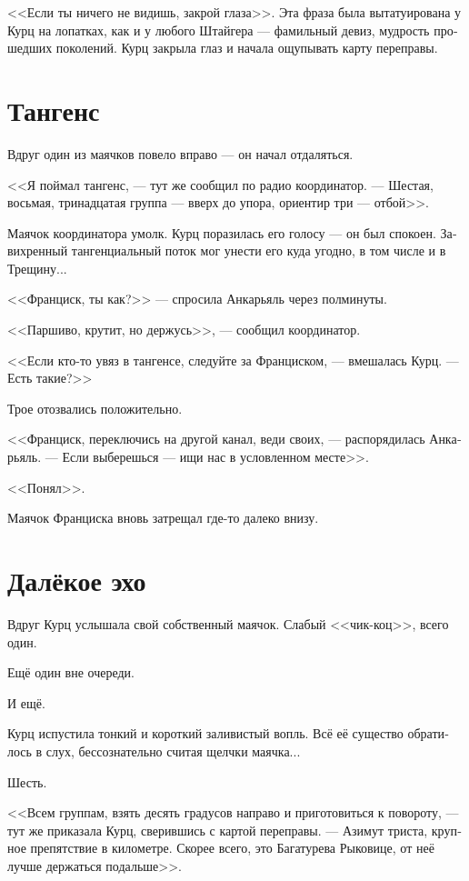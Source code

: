 \documentclass[a4paper,12pt,fleqn]{book}\usepackage{polyglossia}\setdefaultlanguage[babelshorthands=true]{russian}\setotherlanguage{english}\defaultfontfeatures{Ligatures=TeX,Mapping=tex-text}\usepackage{xcolor}\newcommand{\ml}[3]{#2}
\begin{document}
<<Если ты ничего не видишь, закрой глаза>>.
Эта фраза была вытатуирована у Курц на лопатках, как и у любого Штайгера --- фамильный девиз, мудрость прошедших поколений.
Курц закрыла глаз и начала ощупывать карту переправы.

\section{Тангенс}

Вдруг один из маячков повело вправо --- он начал отдаляться.

<<Я поймал тангенс, --- тут же сообщил по радио координатор.
\ml{$0$}
{--- Шестая, восьмая, тринадцатая группа --- вверх до упора, ориентир три --- отбой>>.}
{``Group six, eight, thirteen, full up, beacon three is off.''}

Маячок координатора умолк.
Курц поразилась его голосу --- он был спокоен.
Завихренный тангенциальный поток мог унести его куда угодно, в том числе и в Трещину...

<<Франциск, ты как?>> --- спросила Анкарьяль через полминуты.

<<Паршиво, крутит, но держусь>>, --- сообщил координатор.

<<Если кто-то увяз в тангенсе, следуйте за Франциском, --- вмешалась Курц.
--- Есть такие?>>

Трое отозвались положительно.

<<Франциск, переключись на другой канал, веди своих, --- распорядилась Анкарьяль.
--- Если выберешься --- ищи нас в условленном месте>>.

\ml{$0$}
{<<Понял>>.}
{``Roger that.''}

Маячок Франциска вновь затрещал где-то далеко внизу.

\section{Далёкое эхо}

Вдруг Курц услышала свой собственный маячок.
Слабый <<чик-коц>>, всего один.

Ещё один вне очереди.

И ещё.

Курц испустила тонкий и короткий заливистый вопль.
Всё её существо обратилось в слух, бессознательно считая щелчки маячка...

Шесть.

<<Всем группам, взять десять градусов направо и приготовиться к повороту, --- тут же приказала Курц, сверившись с картой переправы.
--- Азимут триста, крупное препятствие в километре.
\ml{$0$}
{Скорее всего, это Багатурева Рыковице, от неё лучше держаться подальше>>.}
{Most likely, it's Bagaturewa Rykovitze, better to keep a fair distance.''}
\end{document}
